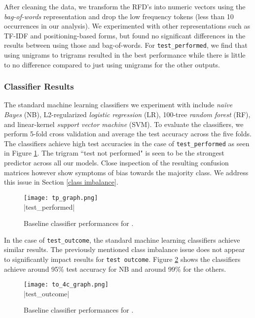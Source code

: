 \documentclass[11pt]{article}
\begin{document}
After cleaning the data, we transform the RFD's into numeric vectors using the \textit{bag-of-words} representation and drop the low frequency tokens (less than 10 occurrences in our analysis). We experimented with other representations such as TF-IDF and positioning-based forms, but found no significant differences in the results between using those and bag-of-words. For \verb|test_performed|, we find that using unigrams to trigrams resulted in the best performance while there is little to no difference compared to just using unigrams for the other outputs.


\subsubsection{Classifier Results} \label{classifier results}

The standard machine learning classifiers we experiment with include \textit{na\"ive Bayes} (NB), L2-regularized \textit{logistic regression} (LR), 100-tree \textit{random forest} (RF), and linear-kernel \textit{support vector machine} (SVM). To evaluate the classifiers, we perform 5-fold cross validation and average the test accuracy across the five folds. The classifiers achieve high test accuracies in the case of \verb|test_performed| as seen in Figure \ref{test performed figure}. The trigram ``test not performed" is seen to be the strongest predictor across all our models. Close inspection of the resulting confusion matrices however show symptoms of bias towards the majority class. We address this issue in Section \ref{class imbalance}.
\\

\begin{figure}[H]
    \centering
    \texttt{[image: tp\_graph.png]} \\
    |test_performed|
    \caption{Baseline classifier performances for \protect{}.}
    \label{test performed figure}
\end{figure}

In the case of \verb|test_outcome|, the standard machine learning classifiers achieve similar results. The previously mentioned class imbalance issue does not appear to significantly impact results for \verb|test outcome|. Figure \ref{test outcome figure} shows the classifiers achieve around 95\% test accuracy for NB and around 99\% for the others.
\\

\begin{figure}[H]
    \centering
    \texttt{[image: to\_4c\_graph.png]} \\
    |test_outcome|
    \caption{Baseline classifier performances for \protect{}.}
    \label{test outcome figure}
\end{figure}
\end{document}
